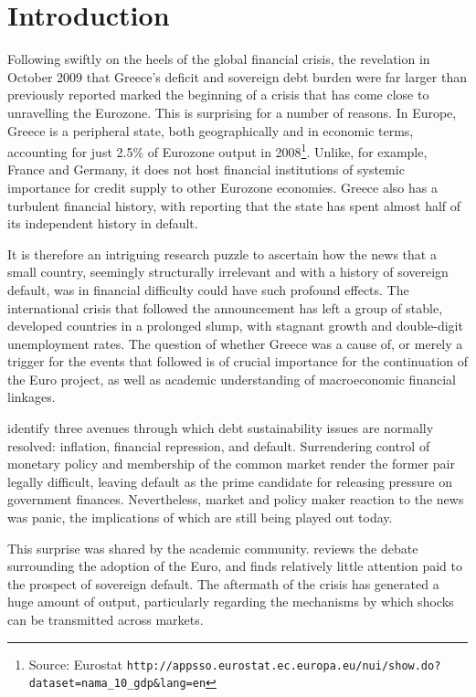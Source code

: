 \documentclass[/../base.tex]{subfiles}
\begin{document}
\section{Introduction}
\label{intro}

Following swiftly on the heels of the global financial crisis, the revelation in October 2009 that Greece's deficit and sovereign debt burden were far larger than previously reported marked the beginning of a crisis  that has come close to unravelling the Eurozone. This is surprising for a number of reasons. In Europe, Greece is a peripheral state, both geographically and in economic terms, accounting for just 2.5\% of Eurozone output in 2008\footnote{Source: Eurostat \texttt{http://appsso.eurostat.ec.europa.eu/nui/show.do?dataset=nama\_10\_gdp\&lang=en}}. Unlike, for example, France and Germany, it does not host financial institutions of systemic importance for credit supply to other Eurozone economies. Greece also has a turbulent financial history, with \cite{kalyvas2015modern} reporting that the state has spent almost half of its independent history in default.

It is therefore an intriguing research puzzle to ascertain how the news that a small country, seemingly structurally irrelevant and with a history of sovereign default, was in financial difficulty could have such profound effects. The international crisis that followed the announcement has left a group of stable, developed countries in a prolonged slump, with stagnant growth and double-digit unemployment rates. The question of whether Greece was a cause of, or merely a trigger for the events that followed is of crucial importance for the continuation of the Euro project, as well as academic understanding of macroeconomic financial linkages.

\cite{reinhart2008time} identify three avenues through which debt sustainability issues are normally resolved: inflation, financial repression, and default. Surrendering control of monetary policy and membership of the common market render the former pair legally difficult, leaving default as the prime candidate for releasing pressure on government finances. Nevertheless, market and policy maker reaction to the news was panic, the implications of which are still being played out today.

This surprise was shared by the academic community. \cite{whelan2013sovereign} reviews the debate surrounding the adoption of the Euro, and finds relatively little attention paid to the prospect of sovereign default. The aftermath of the crisis has generated a huge amount of output, particularly regarding the mechanisms by which shocks can be transmitted across markets. 
\end{document}
